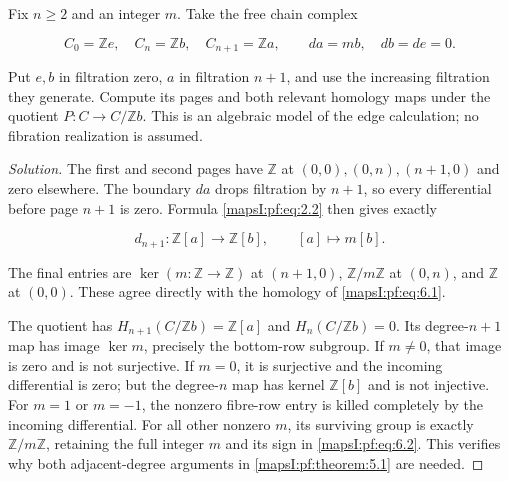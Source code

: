 \begin{example}
\label{mapsI:pf:exercise:6.1} Fix \(n\geq2\) and an integer \(m\). Take the free chain complex

\begin{equation}
C_0=\mathbb Ze,\quad C_n=\mathbb Zb,\quad C_{n+1}=\mathbb Za,
\qquad da=mb,\quad db=de=0.
\label{mapsI:pf:eq:6.1}
\end{equation}

Put \(e,b\) in filtration zero, \(a\) in filtration \(n+1\), and use the increasing filtration they generate. Compute its pages and both relevant homology maps under the quotient \(P:C\to C/\mathbb Zb\). This is an algebraic model of the edge calculation; no fibration realization is assumed.

\end{example}
\begin{proof}[Solution] The first and second pages have \(\mathbb Z\) at \((0,0),(0,n),(n+1,0)\) and zero elsewhere. The boundary \(da\) drops filtration by \(n+1\), so every differential before page \(n+1\) is zero. Formula \eqref{mapsI:pf:eq:2.2} then gives exactly

\begin{equation}
d_{n+1}:\mathbb Z[a]\longrightarrow\mathbb Z[b],
\qquad [a]\longmapsto m[b].
\label{mapsI:pf:eq:6.2}
\end{equation}

The final entries are \(\ker(m:\mathbb Z\to\mathbb Z)\) at \((n+1,0)\), \(\mathbb Z/m\mathbb Z\) at \((0,n)\), and \(\mathbb Z\) at \((0,0)\). These agree directly with the homology of \eqref{mapsI:pf:eq:6.1}.

The quotient has \(H_{n+1}(C/\mathbb Zb)=\mathbb Z[a]\) and \(H_n(C/\mathbb Zb)=0\). Its degree-\(n+1\) map has image \(\ker m\), precisely the bottom-row subgroup. If \(m\ne0\), that image is zero and is not surjective. If \(m=0\), it is surjective and the incoming differential is zero; but the degree-\(n\) map has kernel \(\mathbb Z[b]\) and is not injective. For \(m=1\) or \(m=-1\), the nonzero fibre-row entry is killed completely by the incoming differential. For all other nonzero \(m\), its surviving group is exactly \(\mathbb Z/m\mathbb Z\), retaining the full integer \(m\) and its sign in \eqref{mapsI:pf:eq:6.2}. This verifies why both adjacent-degree arguments in \cref{mapsI:pf:theorem:5.1} are needed.
\end{proof}

